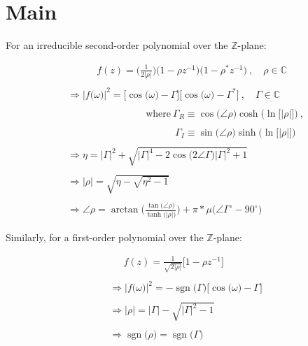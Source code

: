 \documentclass{article}
\DeclareMathOperator{\sgn}{sgn}
\begin{document}
\section{Main}

For an irreducible second-order polynomial over the $\mathbb{Z}$-plane:

\begin{align*}
    & \quad \quad \quad f(z) = \bigg(\frac{1}{2\big|\rho\big|}\bigg)\big(1 - \rho z^{-1}\big)\big(1 - \rho^{*}z^{-1}\big) \ , \quad \rho \in \mathbb{C} \\ \\
    & \Rightarrow \Big|f\big(\omega\big)\Big|^{2} = \Big[\cos\big(\omega\big) - \Gamma\Big]\Big[\cos\big(\omega\big) - \Gamma^{*}\Big] \ , \quad \Gamma \in \mathbb{C} \\ \\ 
    & \quad \quad \quad \quad \quad \quad \quad \quad \text{where} \ \Gamma_{R} \equiv \cos\big(\angle{\rho}\big)\cosh\Big(\ln\big[\big|\rho\big|\big]\Big) \ , \\ \\  
    & \quad \quad \quad \quad \quad \quad \quad \quad \quad \quad \quad \Gamma_{I} \equiv \sin\big(\angle{\rho}\big)\sinh\Big(\ln\big[\big|\rho\big|\big]\Big) \\ \\
    & \Rightarrow \eta = \big|\Gamma\big|^{2} + \sqrt{\big|\Gamma\big|^{4} - 2\cos\big(2\angle{\Gamma}\big)|\Gamma|^{2} + 1} \\ \\
    & \Rightarrow \big|\rho\Big| = \sqrt{\eta - \sqrt{\eta^{2} - 1}} \\ \\
    & \Rightarrow \angle{\rho} = \arctan\Bigg( \frac{\tan\big(\angle{\rho}\big)}{\tanh\big(\big|\rho\big|\big)} \Bigg) + \pi * \mu\Big(\angle{\Gamma}^{\circ} - 90^{\circ}\Big)
  \end{align*}\newline

Similarly, for a first-order polynomial over the $\mathbb{Z}$-plane:

\begin{align*}
    & \quad \ \ f(z) = \frac{1}{\sqrt{2\big|\rho\big|}}\big[1 - \rho z^{-1}\big] \\ \\
    & \Rightarrow \Big|f\big(\omega\big)\Big|^{2} = -\sgn\big(\Gamma\big)\bigg[\cos\big(\omega\big) - \Gamma\bigg] \\ \\ 
    & \Rightarrow \big|\rho\big| = \big|\Gamma\big| - \sqrt{\big|\Gamma\big|^{2} - 1} \\ \\
    & \Rightarrow \sgn\big(\rho\big) = \sgn\big(\Gamma\big)
  \end{align*}
\end{document}
